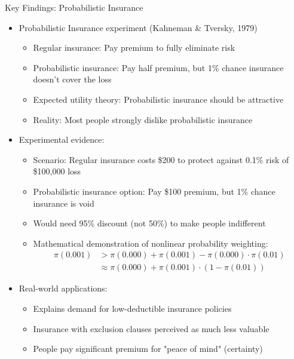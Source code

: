 \documentclass[10pt,handout]{beamer}
\begin{document}
\begin{frame}{Key Findings: Probabilistic Insurance}
  \begin{itemize}[<+->]
    \item Probabilistic Insurance experiment (Kahneman \& Tversky, 1979)
      \begin{itemize}
        \item Regular insurance: Pay premium to fully eliminate risk
        \item Probabilistic insurance: Pay half premium, but 1\% chance insurance doesn't cover the loss
        \item Expected utility theory: Probabilistic insurance should be attractive
        \item Reality: Most people strongly dislike probabilistic insurance
      \end{itemize}
    \item Experimental evidence:
      \begin{itemize}
        \item Scenario: Regular insurance costs \$200 to protect against 0.1\% risk of \$100,000 loss
        \item Probabilistic insurance option: Pay \$100 premium, but 1\% chance insurance is void
        \item Would need 95\% discount (not 50\%) to make people indifferent
        \item Mathematical demonstration of nonlinear probability weighting:
          \begin{align*}
            \pi(0.001) &> \pi(0.000) + \pi(0.001) - \pi(0.000) \cdot \pi(0.01)\\
            &\approx \pi(0.000) + \pi(0.001) \cdot (1 - \pi(0.01))
          \end{align*}
      \end{itemize}
    \item Real-world applications:
      \begin{itemize}
        \item Explains demand for low-deductible insurance policies
        \item Insurance with exclusion clauses perceived as much less valuable
        \item People pay significant premium for "peace of mind" (certainty)
      \end{itemize}
  \end{itemize}
\end{frame}
\end{document}
